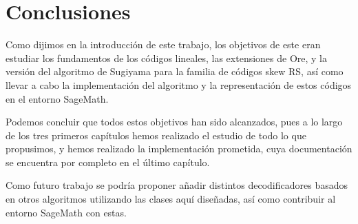 \chapter*{Conclusiones}%
\label{chap:conclusiones}

Como dijimos en la introducción de este trabajo, los objetivos de este eran estudiar los fundamentos de los códigos lineales, las extensiones de Ore, y la versión del algoritmo de Sugiyama para la familia de códigos skew RS, así como llevar a cabo la implementación del algoritmo y la representación de estos códigos en el entorno SageMath.

Podemos concluir que todos estos objetivos han sido alcanzados, pues a lo largo de los tres primeros capítulos hemos realizado el estudio de todo lo que propusimos, y hemos realizado la implementación prometida, cuya documentación se encuentra por completo en el último capítulo.

Como futuro trabajo se podría proponer añadir distintos decodificadores basados en otros algoritmos utilizando las clases aquí diseñadas, así como contribuir al entorno SageMath con estas.
